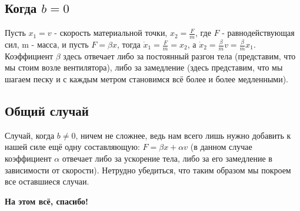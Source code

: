 \documentclass[a4paper,14pt]{extarticle}
\begin{document}
	\subsection{Когда $b=0$}
	Пусть $x_1 = v$ - скорость материальной точки, $x_2 = \frac{F}{m}$, где $F$ - равнодействующая сил, m - масса, и пусть $F = \beta x$, тогда $\dot{x}_1=\frac{F}{m}=x_2$, а $\dot{x}_2=\frac{\beta}{m}v=\frac{\beta}{m}x_1$. Коэффициент $\beta$ здесь отвечает либо за постоянный разгон тела (представим, что мы стоим возле вентилятора), либо за замедление (здесь представим, что мы шагаем песку и с каждым метром становимся всё более и более медленными).
	\subsection{Общий случай}
	Случай, когда $b \neq 0$, ничем не сложнее, ведь нам всего лишь нужно добавить к нашей силе ещё одну составляющую: $F=\beta x + \alpha v$ (в данном случае коэффициент $\alpha$ отвечает либо за ускорение тела, либо за его замедление в зависимости от скорости). Нетрудно убедиться, что таким образом мы покроем все оставшиеся случаи.
	
	\textbf{На этом всё, спасибо!}
\end{document}
